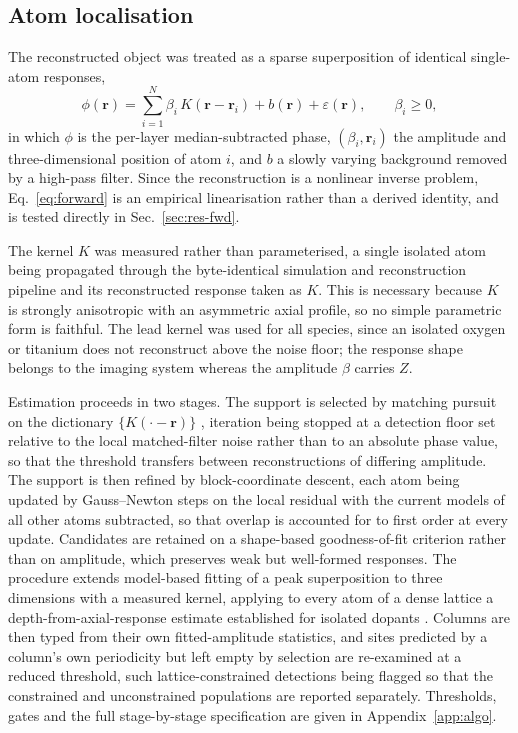 \documentclass[aps,prb,twocolumn,superscriptaddress,floatfix,nofootinbib]{revtex4-2}
\begin{document}
\subsection{Atom localisation}
\label{sec:atomfind}

The reconstructed object was treated as a sparse superposition of identical single-atom
responses,
\begin{equation}
  \phi(\mathbf{r}) = \sum_{i=1}^{N} \beta_i\, K(\mathbf{r}-\mathbf{r}_i) + b(\mathbf{r})
  + \varepsilon(\mathbf{r}), \qquad \beta_i \ge 0,
  \label{eq:forward}
\end{equation}
in which $\phi$ is the per-layer median-subtracted phase, $(\beta_i,\mathbf{r}_i)$ the amplitude
and three-dimensional position of atom $i$, and $b$ a slowly varying background removed by a
high-pass filter. Since the reconstruction is a nonlinear inverse problem,
Eq.~\eqref{eq:forward} is an empirical linearisation rather than a derived identity, and is
tested directly in Sec.~\ref{sec:res-fwd}.

The kernel $K$ was measured rather than parameterised, a single isolated atom being propagated
through the byte-identical simulation and reconstruction pipeline and its reconstructed response
taken as $K$. This is necessary because $K$ is strongly anisotropic with an asymmetric axial
profile, so no simple parametric form is faithful. The lead kernel was used for all species,
since an isolated oxygen or titanium does not reconstruct above the noise floor; the response
shape belongs to the imaging system whereas the amplitude $\beta$ carries $Z$.

Estimation proceeds in two stages. The support is selected by matching pursuit on the dictionary
$\{K(\cdot-\mathbf{r})\}$ \citep{MallatZhang1993}, iteration being stopped at a
detection floor set relative to the local matched-filter noise rather than to an absolute phase
value, so that the threshold transfers between reconstructions of differing amplitude. The
support is then refined by block-coordinate descent, each atom being updated by Gauss--Newton
steps on the local residual with the current models of all other atoms subtracted, so that
overlap is accounted for to first order at every update. Candidates are retained on a
shape-based goodness-of-fit criterion rather than on amplitude, which preserves weak but
well-formed responses. The procedure extends model-based fitting of a peak superposition
\citep{DeBacker2016} to three dimensions with a measured kernel, applying to every atom of a
dense lattice a depth-from-axial-response estimate established for isolated dopants
\citep{Chen2021}. Columns are then typed from their own fitted-amplitude
statistics, and sites predicted by a column's own periodicity but left empty by selection are
re-examined at a reduced threshold, such lattice-constrained detections being flagged so that
the constrained and unconstrained populations are reported separately. Thresholds, gates and
the full stage-by-stage specification are given in Appendix~\ref{app:algo}.
\end{document}
